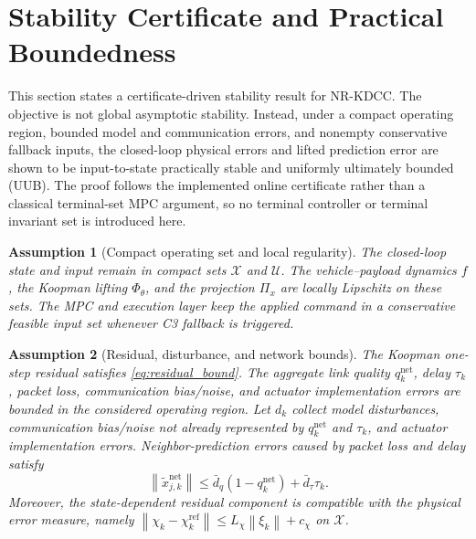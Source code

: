 \documentclass[twocolumn,3p,times,procedia]{elsarticle}
\newcommand{\Method}{NR-KDCC}
\newcommand{\norm}[1]{\left\lVert #1 \right\rVert}
\newtheorem{assumption}{Assumption}
\begin{document}
\section{Stability Certificate and Practical Boundedness}

This section states a certificate-driven stability result for \Method{}. The objective is not global asymptotic stability. Instead, under a compact operating region, bounded model and communication errors, and nonempty conservative fallback inputs, the closed-loop physical errors and lifted prediction error are shown to be input-to-state practically stable and uniformly ultimately bounded (UUB). The proof follows the implemented online certificate rather than a classical terminal-set MPC argument, so no terminal controller or terminal invariant set is introduced here.

\begin{assumption}[Compact operating set and local regularity]
The closed-loop state and input remain in compact sets $\mathcal X$ and $\mathcal U$. The vehicle--payload dynamics $f$, the Koopman lifting $\Phi_\theta$, and the projection $\Pi_x$ are locally Lipschitz on these sets. The MPC and execution layer keep the applied command in a conservative feasible input set whenever C3 fallback is triggered.
\end{assumption}

\begin{assumption}[Residual, disturbance, and network bounds]
The Koopman one-step residual satisfies \eqref{eq:residual_bound}. The aggregate link quality $q_k^{\mathrm{net}}$, delay $\tau_k$, packet loss, communication bias/noise, and actuator implementation errors are bounded in the considered operating region. Let $d_k$ collect model disturbances, communication bias/noise not already represented by $q_k^{\mathrm{net}}$ and $\tau_k$, and actuator implementation errors. Neighbor-prediction errors caused by packet loss and delay satisfy
\begin{equation}
\norm{\tilde x_{j,k}^{\mathrm{net}}}\le
\bar d_q(1-q_k^{\mathrm{net}})+\bar d_\tau \tau_k .
\label{eq:network_prediction_error_bound}
\end{equation}
Moreover, the state-dependent residual component is compatible with the physical error measure, namely
$\norm{\chi_k-\chi_k^{\mathrm{ref}}}\le L_\chi\norm{\xi_k}+c_\chi$ on $\mathcal X$.
\end{assumption}
\end{document}
